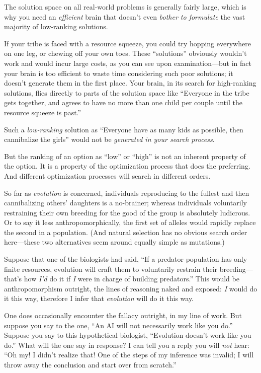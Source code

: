 {{{
 The solution space on all real-world problems is generally fairly
large, which is why you need an \textit{efficient} brain that
doesn't even \textit{bother to formulate} the vast
majority of low-ranking solutions.}

{
 If your tribe is faced with a resource squeeze, you could try
hopping everywhere on one leg, or chewing off your own toes. These
``solutions'' obviously
wouldn't work and would incur large costs, as you can
see upon examination---but in fact your brain is too efficient to waste
time considering such poor solutions; it doesn't
generate them in the first place. Your brain, in its search for
high-ranking solutions, flies directly to parts of the solution space
like ``Everyone in the tribe gets together, and agrees
to have no more than one child per couple until the resource squeeze is
past.''}

{
 Such a \textit{low-ranking} solution as
``Everyone have as many kids as possible, then
cannibalize the girls'' would not be
\textit{generated in your search process}.}

{
 But the ranking of an option as
``low'' or
``high'' is not an inherent property
of the option. It is a property of the optimization process that does
the preferring. And different optimization processes will search in
different orders.}

{
 So far as \textit{evolution} is concerned, individuals reproducing
to the fullest and then cannibalizing others' daughters
is a no-brainer; whereas individuals voluntarily restraining their own
breeding for the good of the group is absolutely ludicrous. Or to say
it less anthropomorphically, the first set of alleles would rapidly
replace the second in a population. (And natural selection has no
obvious search order here---these two alternatives seem around equally
simple as mutations.)}

{
 Suppose that one of the biologists had said, ``If
a predator population has only finite resources, evolution will craft
them to voluntarily restrain their breeding---that's
how \textit{I'd} do it if \textit{I} were in charge of
building predators.'' This would be anthropomorphism
outright, the lines of reasoning naked and exposed: \textit{I} would do
it this way, therefore I infer that \textit{evolution} will do it this
way.}

{
 One does occasionally encounter the fallacy outright, in my line
of work. But suppose you say to the one, ``An AI will
not necessarily work like you do.'' Suppose you say
to this hypothetical biologist, ``Evolution
doesn't work like you do.'' What will
the one say in response? I can tell you a reply you will \textit{not}
hear: ``Oh my! I didn't realize that!
One of the steps of my inference was invalid; I will throw away the
conclusion and start over from scratch.''}

}}
